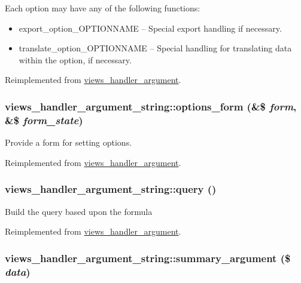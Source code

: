 Each option may have any of the following functions:\begin{itemize}
\item export\_\-option\_\-OPTIONNAME -- Special export handling if necessary.\item translate\_\-option\_\-OPTIONNAME -- Special handling for translating data within the option, if necessary. \end{itemize}


Reimplemented from \hyperlink{classviews__handler__argument_117ab20a53624e082e6e32a22d4521cc}{views\_\-handler\_\-argument}.\hypertarget{classviews__handler__argument__string_b96e2120f4f4458921f817b343d11ef0}{
\subsubsection[{options\_\-form}]{\setlength{\rightskip}{0pt plus 5cm}views\_\-handler\_\-argument\_\-string::options\_\-form (\&\$ {\em form}, \/  \&\$ {\em form\_\-state})}}
\label{classviews__handler__argument__string_b96e2120f4f4458921f817b343d11ef0}


Provide a form for setting options. 

Reimplemented from \hyperlink{classviews__handler__argument_44f015a0d527983ae6df2689f66b2c24}{views\_\-handler\_\-argument}.\hypertarget{classviews__handler__argument__string_d50bba6781755cfcd29b2a493dd838ec}{
\subsubsection[{query}]{\setlength{\rightskip}{0pt plus 5cm}views\_\-handler\_\-argument\_\-string::query ()}}
\label{classviews__handler__argument__string_d50bba6781755cfcd29b2a493dd838ec}


Build the query based upon the formula 

Reimplemented from \hyperlink{classviews__handler__argument_c4b0ce6704a10f515b2aea2f9e790994}{views\_\-handler\_\-argument}.\hypertarget{classviews__handler__argument__string_185c0d31b97f98df85073d53b3f8c26d}{
\subsubsection[{summary\_\-argument}]{\setlength{\rightskip}{0pt plus 5cm}views\_\-handler\_\-argument\_\-string::summary\_\-argument (\$ {\em data})}}
\label{classviews__handler__argument__string_185c0d31b97f98df85073d53b3f8c26d}


